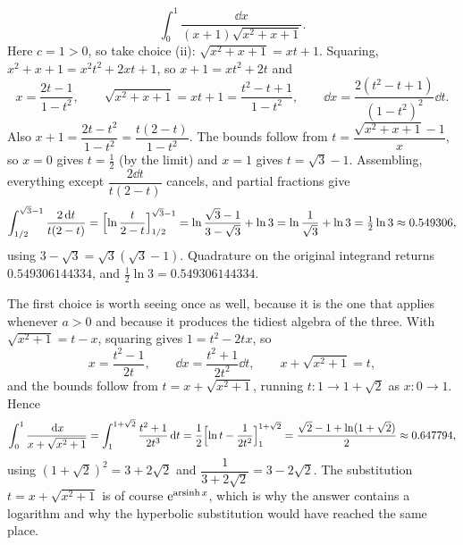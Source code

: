 \begin{worked}
\[
\int_0^1\frac{\dd x}{(x+1)\sqrt{x^2+x+1}} .
\]
Here $c=1>0$, so take choice (ii): $\sqrt{x^2+x+1}=xt+1$. Squaring, $x^2+x+1=x^2t^2+2xt+1$, so $x+1=xt^2+2t$ and
\[
x=\frac{2t-1}{1-t^2},\qquad \sqrt{x^2+x+1}=xt+1=\frac{t^2-t+1}{1-t^2},\qquad
\dd x=\frac{2(t^2-t+1)}{(1-t^2)^2}\dd t .
\]
Also $x+1=\dfrac{2t-t^2}{1-t^2}=\dfrac{t(2-t)}{1-t^2}$. The bounds follow from $t=\dfrac{\sqrt{x^2+x+1}-1}{x}$, so $x=0$ gives $t=\tfrac12$ (by the limit) and $x=1$ gives $t=\sqrt3-1$. Assembling, everything except $\dfrac{2\dd t}{t(2-t)}$ cancels, and partial fractions give
\[
\int_{1/2}^{\sqrt3-1}\frac{2\,\mathrm{d} t}{t(2-t)}=\Bigl[\ln\frac{t}{2-t}\Bigr]_{1/2}^{\sqrt3-1}
=\ln\frac{\sqrt3-1}{3-\sqrt3}+\ln3=\ln\frac{1}{\sqrt3}+\ln3=\tfrac12\ln3\approx0.549306 ,
\]
using $3-\sqrt3=\sqrt3(\sqrt3-1)$. Quadrature on the original integrand returns $0.549306144334$, and $\tfrac12\ln3=0.549306144334$.
\end{worked}

The first choice is worth seeing once as well, because it is the one that applies whenever $a>0$ and because it produces the tidiest algebra of the three. With $\sqrt{x^2+1}=t-x$, squaring gives $1=t^2-2tx$, so
\[
x=\frac{t^2-1}{2t},\qquad \dd x=\frac{t^2+1}{2t^2}\dd t,\qquad x+\sqrt{x^2+1}=t ,
\]
and the bounds follow from $t=x+\sqrt{x^2+1}$, running $t:1\to1+\sqrt2$ as $x:0\to1$. Hence
\[
\int_0^1\frac{\,\mathrm{d} x}{x+\sqrt{x^2+1}}=\int_1^{1+\sqrt2}\frac{t^2+1}{2t^3}\,\mathrm{d} t
=\frac12\Bigl[\ln t-\frac{1}{2t^2}\Bigr]_1^{1+\sqrt2}
=\frac{\sqrt2-1+\ln(1+\sqrt2)}{2}\approx0.647794 ,
\]
using $(1+\sqrt2)^2=3+2\sqrt2$ and $\dfrac{1}{3+2\sqrt2}=3-2\sqrt2$. The substitution $t=x+\sqrt{x^2+1}$ is of course $\mathrm{e}^{\operatorname{arsinh}x}$, which is why the answer contains a logarithm and why the hyperbolic substitution would have reached the same place.

